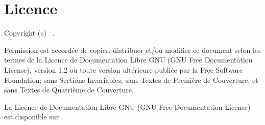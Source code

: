 \chapter{Licence}

Copyright (c)  \workdateyear~\theauthor.

\smallskip
Permission est accordée de copier, distribuer et/ou modifier ce document selon les termes de la Licence de Documentation Libre GNU (GNU Free Documentation License), version 1.2 ou toute version ultérieure publiée par la Free Software Foundation; sans Sections Invariables; sans Textes de Première de Couverture, et sans Textes de Quatrième de Couverture.

La Licence de Documentation Libre GNU (GNU Free Documentation License) est disponible sur .
